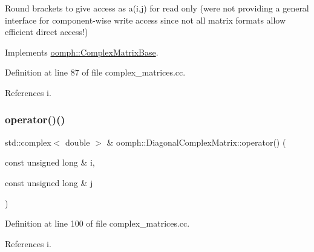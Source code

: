 Round brackets to give access as a(i,j) for read only (we\textquotesingle{}re not providing a general interface for component-\/wise write access since not all matrix formats allow efficient direct access!) 



Implements \hyperlink{classoomph_1_1ComplexMatrixBase_a78d1185ec8249fec5855d01129a1c870}{oomph\+::\+Complex\+Matrix\+Base}.



Definition at line 87 of file complex\+\_\+matrices.\+cc.



References i.

\mbox{\label{classoomph_1_1DiagonalComplexMatrix_a27f2ff667b59a6a115d04a6c40df82a1}} 
\subsubsection{\texorpdfstring{operator()()}{operator()()}\hspace{0.1cm}{\footnotesize\ttfamily [2/2]}}
{\footnotesize\ttfamily std\+::complex$<$ double $>$ \& oomph\+::\+Diagonal\+Complex\+Matrix\+::operator() (\begin{DoxyParamCaption}\item[{const unsigned long \&}]{i,  }\item[{const unsigned long \&}]{j }\end{DoxyParamCaption})\hspace{0.3cm}{\ttfamily [virtual]}}



Definition at line 100 of file complex\+\_\+matrices.\+cc.



References i.

\mbox{\label{classoomph_1_1DiagonalComplexMatrix_a320b1114e1be99d82694793b30ce9251}} 
